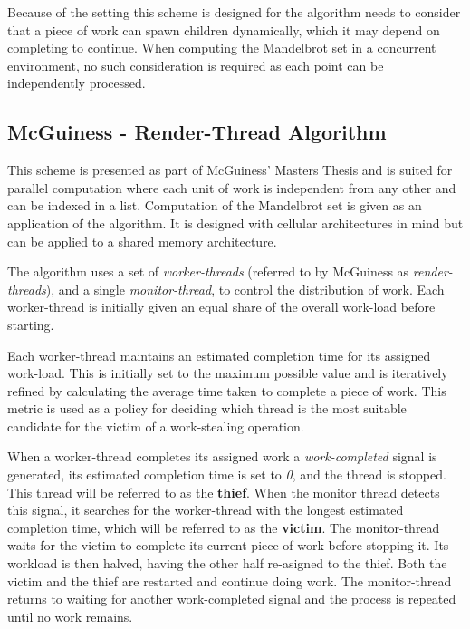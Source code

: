 Because of the setting this scheme is designed for the algorithm needs to consider that
a piece of work can spawn children dynamically, which it may depend on completing to continue. 
When computing the Mandelbrot set in a concurrent environment, no such consideration is required 
as each point can be independently processed.

\subsection*{McGuiness - Render-Thread Algorithm}
\label{sec:rendscheme}

This scheme is presented as part of McGuiness' Masters Thesis \cite{jmcguin} and is suited for parallel computation where each unit of work is independent 
from any other and can be indexed in a list. Computation of the Mandelbrot set is given as an application of the algorithm. 
It is designed with cellular architectures in mind but can be applied to a shared memory architecture. 

The algorithm uses a set of \textit{worker-threads} (referred to by McGuiness as \textit{render-threads}), 
and a single \textit{monitor-thread}, to control the distribution of work. Each worker-thread is
initially given an equal share of the overall work-load before starting.

Each worker-thread maintains an estimated completion time for its assigned work-load. This is initially set to the maximum possible value and
is iteratively refined by calculating the average time taken to complete a piece of work. This metric is used as a policy for deciding which
thread is the most suitable candidate for the victim of a work-stealing operation.

When a worker-thread completes its assigned work a \textit{work-completed} signal is generated, its estimated
completion time is set to \textit{0}, and the thread is stopped. This thread will be referred to as the \textbf{thief}.
When the monitor thread detects this signal, it searches for the worker-thread with the longest estimated completion time, 
which will be referred to as the \textbf{victim}. The monitor-thread waits for the victim to complete its current piece of work before stopping it.
Its workload is then halved, having the other half re-asigned to the thief. Both the victim and the thief are restarted and continue doing work.
The monitor-thread returns to waiting for another work-completed signal and the process is repeated until no work remains.

